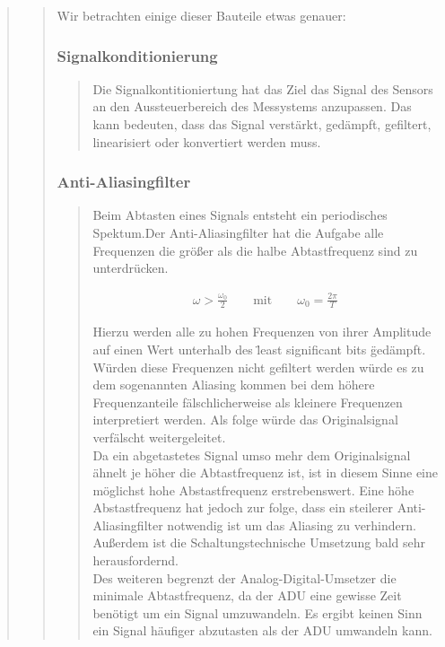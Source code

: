 \begin{quote}
\begin{quote}
	 	Wir betrachten einige dieser Bauteile etwas genauer:
	 	\subsubsection{Signalkonditionierung}
		\begin{quote}
			Die Signalkontitioniertung hat das Ziel das Signal des Sensors an den Aussteuerbereich des Messystems anzupassen. Das
			kann bedeuten, dass das Signal verstärkt, gedämpft, gefiltert, linearisiert oder konvertiert werden muss. 
		\end{quote}
		\subsubsection{Anti-Aliasingfilter}
		\begin{quote}
		      Beim Abtasten eines Signals entsteht ein periodisches Spektum.Der Anti-Aliasingfilter hat die Aufgabe alle
		      Frequenzen die größer als die halbe Abtastfrequenz sind zu unterdrücken. 
		      
		      \begin{equation*}
                	\begin{split}
                		\omega > \frac{\omega_0}{2} \hspace{2em} \text{mit} \hspace{2em} \omega_0 = \frac{2\pi}{T}
                	\end{split}
                \end{equation*}
		      
		      Hierzu werden alle zu hohen Frequenzen von ihrer Amplitude auf einen Wert unterhalb des
              \" least significant bits \" gedämpft.\\
		      
		      Würden diese Frequenzen nicht gefiltert werden würde es zu dem sogenannten Aliasing kommen bei dem höhere
		      Frequenzanteile fälschlicherweise als kleinere Frequenzen interpretiert werden. Als folge würde das
		      Originalsignal verfälscht weitergeleitet.\\
		      
		      Da ein abgetastetes Signal umso mehr dem Originalsignal ähnelt je höher die Abtastfrequenz ist, ist in diesem
		      Sinne eine möglichst hohe Abstastfrequenz erstrebenswert. Eine höhe Abstastfrequenz hat jedoch zur folge, dass
		      ein steilerer Anti-Aliasingfilter notwendig ist um das Aliasing zu verhindern. Außerdem ist die
		      Schaltungstechnische Umsetzung bald sehr herausfordernd.\\
		      Des weiteren begrenzt der Analog-Digital-Umsetzer die minimale Abtastfrequenz, da der ADU eine gewisse Zeit
		      benötigt um ein Signal umzuwandeln. Es ergibt keinen Sinn ein Signal
		      häufiger abzutasten als der ADU umwandeln kann.
		\end{quote}

\end{quote}
\end{quote}
